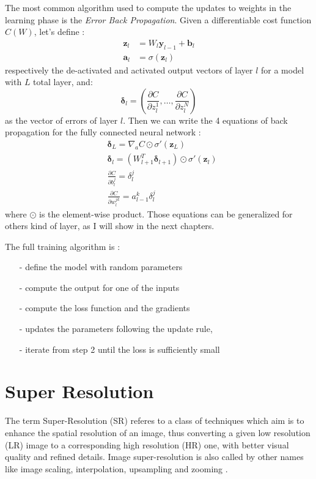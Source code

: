 \documentclass[12pt,a4paper]{report}
\begin{document}
The most common algorithm used to compute the updates to weights in the learning phase is the {\it Error Back Propagation}. 
Given a differentiable cost function $C(W)$, let's define :
\begin{align}
 \bm{z}_l &= W_l \bm{y}_{l-1} + \bm{b}_l  \\ 
 \bm{a}_l &= \sigma(\bm{z}_l)
\end{align}
respectively the de-activated and activated output vectors of layer $l$ for a model with $L$ total layer, and:
\begin{equation}
 \bm{\delta}_l = (\frac{\partial C}{\partial z_l^1}, \dots , \frac{\partial C}{\partial z_l^N}) 
\end{equation}
as the vector of errors of layer $l$. Then we can write the 4 equations of back propagation for the fully connected neural network \cite{neural-net-nielsen}:
\begin{align}
  &\bm{\delta}_L = \nabla_a C \odot \sigma'(\bm{z}_L) \\ 
  &\bm{\delta}_l = (W_{l+1}^T \bm{\delta}_{l+1}) \odot \sigma'(\bm{z}_l) \\
  &\frac{\partial C}{\partial b_l^j} = \delta_l^j \\
  &\frac{\partial C}{\partial w_l^{j k}} = a_{l-1}^k \delta_{l}^{j}
\end{align}
where  $\odot$ is the element-wise product.
Those equations can be generalized for others kind of layer, as I will show in the next chapters. 

The full training algorithm is : 

\begin{itemize}
 \setlength\itemsep{-0.3em}
 \item [-] define the model with random parameters
 \item [-] compute the output for one of the inputs
 \item [-] compute the loss function and the gradients
 \item [-] updates the parameters following the update rule, 
 \item [-] iterate from step 2 until the loss is sufficiently small
\end{itemize}

\section{Super Resolution}

The term Super-Resolution (SR) referes to a class of techniques which aim is to enhance the spatial resolution of an image, thus converting a given low resolution (LR) image to a corresponding high resolution (HR) one, with better visual quality and refined details.
Image super-resolution is also called by other names like image scaling, interpolation, upsampling and zooming \cite{survey-sr}.
\end{document}
